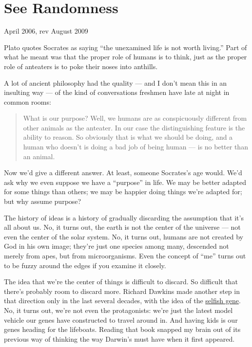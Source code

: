 \chapter{See Randomness}

April 2006, rev August 2009

Plato quotes Socrates as saying ``the unexamined life is not worth
living.'' Part of what he meant was that the proper role of humans is to
think, just as the proper role of anteaters is to poke their noses into
anthills.

A lot of ancient philosophy had the quality --- and I don't mean this in
an insulting way --- of the kind of conversations freshmen have late at
night in common rooms:

\begin{quote}
What is our purpose? Well, we humans are as conspicuously different from
other animals as the anteater. In our case the distinguishing feature is
the ability to reason. So obviously that is what we should be doing, and
a human who doesn't is doing a bad job of being human --- is no better
than an animal.
\end{quote}

Now we'd give a different answer. At least, someone Socrates's age
would. We'd ask why we even suppose we have a ``purpose'' in life. We
may be better adapted for some things than others; we may be happier
doing things we're adapted for; but why assume purpose?

The history of ideas is a history of gradually discarding the assumption
that it's all about us. No, it turns out, the earth is not the center of
the universe --- not even the center of the solar system. No, it turns
out, humans are not created by God in his own image; they're just one
species among many, descended not merely from apes, but from
microorganisms. Even the concept of ``me'' turns out to be fuzzy around
the edges if you examine it closely.

The idea that we're the center of things is difficult to discard. So
difficult that there's probably room to discard more. Richard Dawkins
made another step in that direction only in the last several decades,
with the idea of the
\href{http://en.wikipedia.org/wiki/The_Selfish_Gene}{selfish gene}. No,
it turns out, we're not even the protagonists: we're just the latest
model vehicle our genes have constructed to travel around in. And having
kids is our genes heading for the lifeboats. Reading that book snapped
my brain out of its previous way of thinking the way Darwin's must have
when it first appeared.


